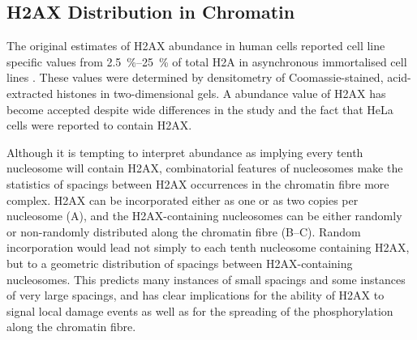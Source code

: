 \subsection{H2AX Distribution in Chromatin}
\label{subsec:h2ax-review:H2AX-distribution}
The original estimates of H2AX abundance in human cells reported cell
line specific values from \SIrange{2.5}{25}{\percent} of total H2A in
asynchronous immortalised cell lines \citep{EPR+98}. These values were
determined by densitometry of Coomassie-stained, acid-extracted
histones in two-dimensional gels. A  abundance value of H2AX
has become accepted despite wide differences in the study and the fact
that HeLa cells were reported to contain  H2AX\@.

Although it is tempting to interpret  abundance as implying
every tenth nucleosome will contain H2AX, combinatorial features of
nucleosomes make the statistics of spacings between H2AX occurrences
in the chromatin fibre more complex. H2AX can be incorporated either
as one or as two copies per nucleosome
(A), and the H2AX-containing
nucleosomes can be either randomly or non-randomly distributed along
the chromatin fibre (B--C).
Random incorporation would lead not simply to each tenth nucleosome
containing H2AX, but to a geometric distribution of spacings between
H2AX-containing nucleosomes. This predicts many instances of small
spacings and some instances of very large spacings, and has clear
implications for the ability of \textgamma H2AX to signal local damage
events as well as for the spreading of the phosphorylation along the
chromatin fibre.

